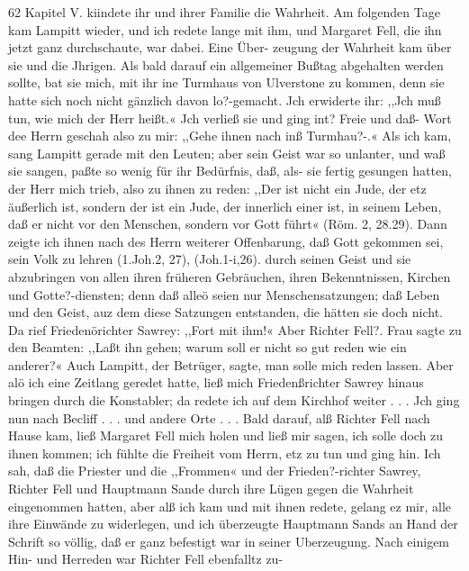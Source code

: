 62 Kapitel V.
kiindete ihr und ihrer Familie die Wahrheit. Am folgenden Tage
kam Lampitt wieder, und ich redete lange mit ihm, und Margaret
Fell, die ihn jetzt ganz durchschaute, war dabei. Eine Über-
zeugung der Wahrheit kam über sie und die Jhrigen. Als bald
darauf ein allgemeiner Bußtag abgehalten werden sollte, bat sie
mich, mit ihr ine Turmhaus von Ulverstone zu kommen, denn
sie hatte sich noch nicht gänzlich davon lo?-gemacht. Jch erwiderte
ihr: ,,Jch muß tun, wie mich der Herr heißt.« Jch verließ sie
und ging int? Freie und daß- Wort dee Herrn geschah also zu
mir: ,,Gehe ihnen nach inß Turmhau?-.« Als ich kam, sang
Lampitt gerade mit den Leuten; aber sein Geist war so unlanter,
und waß sie sangen, paßte so wenig für ihr Bedürfnis, daß, als-
sie fertig gesungen hatten, der Herr mich trieb, also zu ihnen zu
reden: ,,Der ist nicht ein Jude, der etz äußerlich ist, sondern der
ist ein Jude, der innerlich einer ist, in seinem Leben, daß er nicht
vor den Menschen, sondern vor Gott führt« (Röm. 2, 28.29).
Dann zeigte ich ihnen nach des Herrn weiterer Offenbarung, daß
Gott gekommen sei, sein Volk zu lehren (1.Joh.2, 27), (Joh.1-i,26).
durch seinen Geist und sie abzubringen von allen ihren früheren
Gebräuchen, ihren Bekenntnissen, Kirchen und Gotte?-diensten;
denn daß alleö seien nur Menschensatzungen; daß Leben und den
Geist, auz dem diese Satzungen entstanden, die hätten sie doch
nicht. Da rief Friedenörichter Sawrey: ,,Fort mit ihm!« Aber
Richter Fell?. Frau sagte zu den Beamten: ,,Laßt ihn gehen;
warum soll er nicht so gut reden wie ein anderer?« Auch Lampitt,
der Betrüger, sagte, man solle mich reden lassen. Aber alö ich eine
Zeitlang geredet hatte, ließ mich Friedenßrichter Sawrey hinaus
bringen durch die Konstabler; da redete ich auf dem Kirchhof
weiter . . . Jch ging nun nach Becliff . . . und andere Orte . . .
Bald darauf, alß Richter Fell nach Hause kam, ließ Margaret
Fell mich holen und ließ mir sagen, ich solle doch zu ihnen
kommen; ich fühlte die Freiheit vom Herrn, etz zu tun und ging
hin. Ich sah, daß die Priester und die ,,Frommen« und der
Frieden?-richter Sawrey, Richter Fell und Hauptmann Sande durch
ihre Lügen gegen die Wahrheit eingenommen hatten, aber alß ich
kam und mit ihnen redete, gelang ez mir, alle ihre Einwände zu
widerlegen, und ich überzeugte Hauptmann Sands an Hand der
Schrift so völlig, daß er ganz befestigt war in seiner Uberzeugung.
Nach einigem Hin- und Herreden war Richter Fell ebenfalltz zu-


